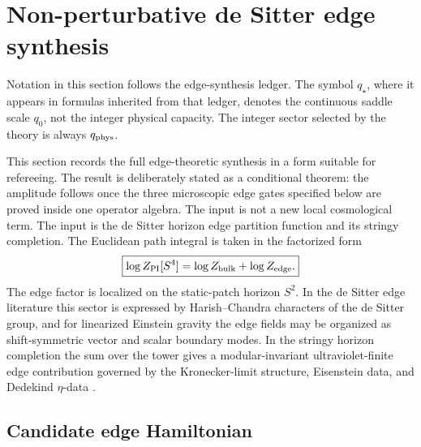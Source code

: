 \documentclass[aps,prd,reprint,nofootinbib,superscriptaddress,floatfix]{revtex4-2}
\numberwithin{equation}{section}
\theoremstyle{definition}
\theoremstyle{plain}
\begin{document}
\section{Non-perturbative de Sitter edge synthesis}
\label{sec:nonperturbative-edge-synthesis}

Notation in this section follows the edge-synthesis ledger.  The
symbol \(q_\star\), where it appears in formulas inherited from that ledger,
denotes the continuous saddle scale \(q_0\), not the integer physical capacity.
The integer sector selected by the theory is always \(q_{\rm phys}\).

This section records the full edge-theoretic synthesis in a form suitable for
refereeing.  The result is deliberately stated as a conditional theorem:
the amplitude follows once the three microscopic edge gates specified below are
proved inside one operator algebra.  The input is not a new local cosmological
term.  The input is the de Sitter horizon edge partition function and its
stringy completion.  The Euclidean path integral is taken in the factorized
form
\[
\boxed{
\log Z_{\rm PI}[S^4]
=
\log Z_{\rm bulk}
+
\log Z_{\rm edge}.
}
\]
The edge factor is localized on the static-patch horizon \(S^2\).  In the
de Sitter edge literature this sector is expressed by Harish--Chandra
characters of the de Sitter group, and for linearized Einstein gravity the
edge fields may be organized as shift-symmetric vector and scalar boundary
modes.  In the stringy horizon completion the sum over the tower gives a
modular-invariant ultraviolet-finite edge contribution governed by the
Kronecker-limit structure, Eisenstein data, and Dedekind \(\eta\)-data
\cite{Law2025dSEdge,DabholkarHarrisMoitra2026,LawLochab2026}.

\subsection{Candidate edge Hamiltonian}
\end{document}
